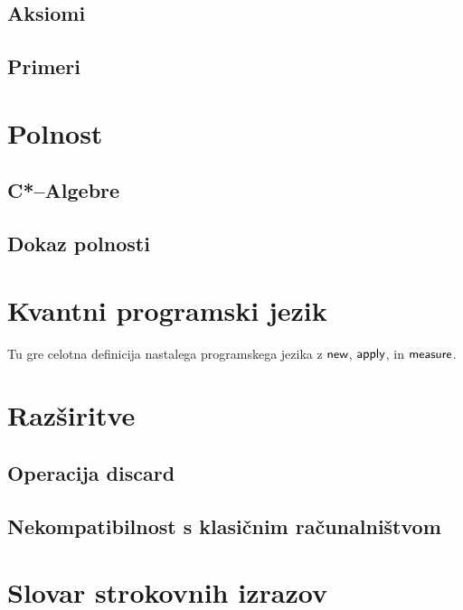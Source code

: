 \documentclass[mat1]{fmfdelo}
\newcommand{\cmd}[1]{\textnormal{\sffamily#1}}
\begin{document}
\subsection{Aksiomi}
\subsection{Primeri}

\section{Polnost}
\subsection{C*--Algebre}
\subsection{Dokaz polnosti}

\section{Kvantni programski jezik}
Tu gre celotna definicija nastalega programskega jezika z \(\cmd{new}\), \(\cmd{apply}\), in \(\cmd{measure}\).

\section{Razširitve}
\subsection{Operacija \cmd{discard}}
\subsection{Nekompatibilnost s klasičnim računalništvom}

\section*{Slovar strokovnih izrazov}

\geslo{}{}
\geslo{}{}

\begin{thebibliography}{99}


\end{thebibliography}
\end{document}
